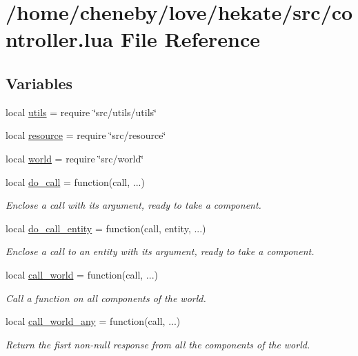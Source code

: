 \hypertarget{controller_8lua}{\section{/home/cheneby/love/hekate/src/controller.lua File Reference}
\label{controller_8lua}
}
\subsection*{Variables}
\begin{DoxyCompactItemize}
\item 
local \hyperlink{controller_8lua_a9b2ba82def3d3656dc370bac0a641700}{utils} = require \char`\"{}src/utils/utils\char`\"{}
\item 
local \hyperlink{controller_8lua_a24ad487107aaa56bef35825abbe9773d}{resource} = require \char`\"{}src/resource\char`\"{}
\item 
local \hyperlink{controller_8lua_a054520f514ab0d9a9b0fede5a23db9f7}{world} = require \char`\"{}src/world\char`\"{}
\item 
local \hyperlink{controller_8lua_a97132b7af7122a75e92b9452712353b9}{do\-\_\-call} = function(call, ...)
\begin{DoxyCompactList}\small\item\em Enclose a call with its argument, ready to take a component. \end{DoxyCompactList}\item 
local \hyperlink{controller_8lua_a936e98b963e63dd16d2d10668a548536}{do\-\_\-call\-\_\-entity} = function(call, entity, ...)
\begin{DoxyCompactList}\small\item\em Enclose a call to an entity with its argument, ready to take a component. \end{DoxyCompactList}\item 
local \hyperlink{controller_8lua_a063db58d193e393e992dc02d752b6abb}{call\-\_\-world} = function(call, ...)
\begin{DoxyCompactList}\small\item\em Call a function on all components of the world. \end{DoxyCompactList}\item 
local \hyperlink{controller_8lua_a496c48185e626830e2a81b29158369e7}{call\-\_\-world\-\_\-any} = function(call, ...)
\begin{DoxyCompactList}\small\item\em Return the fisrt non-\/null response from all the components of the world. \end{DoxyCompactList}\item 

\end{DoxyCompactItemize}
